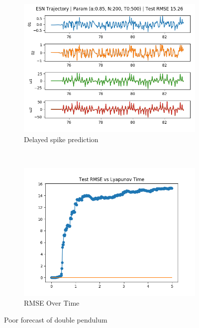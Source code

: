 \documentclass{article}
\begin{document}
\begin{figure}[H]
    \centering
    \begin{subfigure}[b]{0.45\textwidth}
        \includegraphics[width=\textwidth]{doc/paper/images/doub_pend/rank_2_param_305_fit.png}
        \caption{Delayed spike prediction}
    \end{subfigure}
    ~
    \begin{subfigure}[b]{0.45\textwidth}
        \includegraphics[width=\textwidth]{doc/paper/images/doub_pend/rank_2_param_305_rmse.png}
        \caption{RMSE Over Time}
    \end{subfigure}
    \caption{Poor forecast of double pendulum}
\end{figure}
\end{document}
